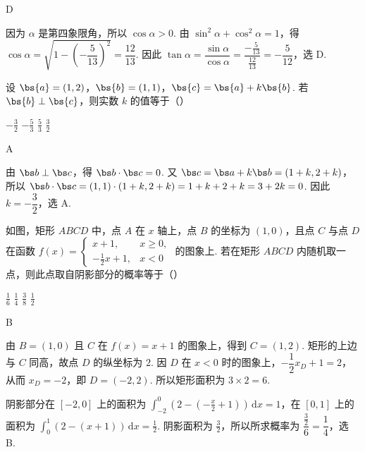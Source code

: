 \begin{answer}
D
\end{answer}

\begin{solution}
因为 \(\alpha\) 是第四象限角，所以 \(\cos\alpha>0\). 由 \(\sin^2\alpha+\cos^2\alpha=1\)，得
\(\cos\alpha=\sqrt{1-\left(-\dfrac5{13}\right)^2}=\dfrac{12}{13}\).
因此 \(\tan\alpha=\dfrac{\sin\alpha}{\cos\alpha}=\dfrac{-\frac{5}{13}}{\frac{12}{13}}=-\dfrac5{12}\)，选 D.
\end{solution}

\begin{problem}
设 \(\bs{a} = (1,2)\)，\(\bs{b} = (1,1)\)，\(\bs{c} = \bs{a} + k\bs{b}\). 若 \(\bs{b} \perp \bs{c}\)，则实数 \(k\) 的值等于（\quad）

\choices
    {\(-\frac{3}{2}\)}
    {\(-\frac{5}{3}\)}
    {\( \frac{5}{3} \)}
    {\( \frac{3}{2} \)}
\end{problem}

\begin{answer}
A
\end{answer}

\begin{solution}
由 \(\bs b\perp\bs c\)，得 \(\bs b\cdot\bs c=0\). 又 \(\bs c=\bs a+k\bs b=(1+k,2+k)\)，所以
\(\bs b\cdot\bs c=(1,1)\cdot(1+k,2+k)=1+k+2+k=3+2k=0\).
因此 \(k=-\dfrac32\)，选 A.
\end{solution}

\begin{problem}
如图，矩形 \(ABCD\) 中，点 \(A\) 在 \(x\) 轴上，点 \(B\) 的坐标为 \((1,0)\)，且点 \(C\) 与点 \(D\) 在函数 \(f(x) = \begin{cases}
x + 1, & x \geqslant 0,\\
-\frac{1}{2}x + 1, & x < 0
\end{cases}\) 的图象上. 若在矩形 \(ABCD\) 内随机取一点，则此点取自阴影部分的概率等于（\quad）


\choices
    {\(\frac{1}{6}\)}
    {\( \frac{1}{4} \)}
    {\( \frac{3}{8} \)}
    {\( \frac{1}{2} \)}
\end{problem}

\begin{answer}
B
\end{answer}

\begin{solution}
由 \(B=(1,0)\) 且 \(C\) 在 \(f(x)=x+1\) 的图象上，得到 \(C=(1,2)\). 矩形的上边与 \(C\) 同高，故点 \(D\) 的纵坐标为 \(2\). 因 \(D\) 在 \(x<0\) 时的图象上，\(-\dfrac12x_D+1=2\)，从而 \(x_D=-2\)，即 \(D=(-2,2)\). 所以矩形面积为 \(3\times2=6\).

阴影部分在 \([-2,0]\) 上的面积为 \(\displaystyle\int_{-2}^{0}\left(2-\left(-\frac{x}{2}+1\right)\right)\,\mathrm dx=1\)，在 \([0,1]\) 上的面积为 \(\displaystyle\int_{0}^{1}\left(2-(x+1)\right)\,\mathrm dx=\frac12\). 阴影面积为 \(\frac32\)，所以所求概率为 \(\dfrac{\frac32}{6}=\dfrac14\)，选 B.
\end{solution}

